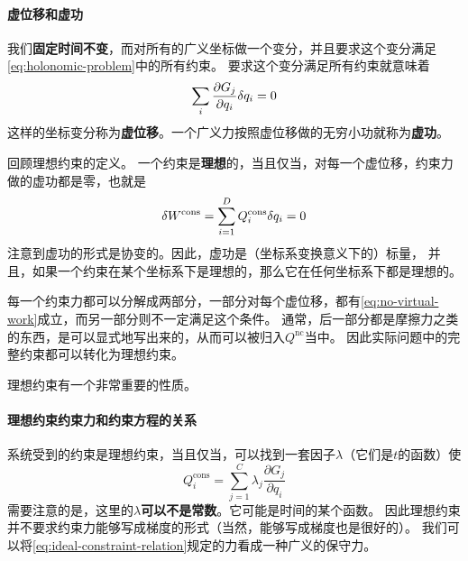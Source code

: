 \documentclass[UTF8, a4paper]{ctexart}
\begin{document}
\paragraph{虚位移和虚功} 我们\textbf{固定时间不变}，而对所有的广义坐标做一个变分，并且要求这个变分满足\eqref{eq:holonomic-problem}中的所有约束。
要求这个变分满足所有约束就意味着
\begin{equation}
    \sum_i \frac{\partial G_j}{\partial q_i} \var q_i = 0
    \label{eq:contemporaneous-variation}
\end{equation}
这样的坐标变分称为\textbf{虚位移}。一个广义力按照虚位移做的无穷小功就称为\textbf{虚功}。

回顾理想约束的定义。
一个约束是\textbf{理想}的，当且仅当，对每一个虚位移，约束力做的虚功都是零，也就是
\begin{equation}
    \var W^\text{cons} = \sum_{i=1}^D Q^\text{cons}_i \var q_i = 0
    \label{eq:no-virtual-work}
\end{equation}
注意到虚功的形式是协变的。因此，虚功是（坐标系变换意义下的）标量，
并且，如果一个约束在某个坐标系下是理想的，那么它在任何坐标系下都是理想的。

每一个约束力都可以分解成两部分，一部分对每个虚位移，都有\eqref{eq:no-virtual-work}成立，而另一部分则不一定满足这个条件。
通常，后一部分都是摩擦力之类的东西，是可以显式地写出来的，从而可以被归入$Q^{\text{nc}}$当中。
因此实际问题中的完整约束都可以转化为理想约束。

理想约束有一个非常重要的性质。

\paragraph{理想约束约束力和约束方程的关系} \label{par:ideal-constraint-relation}
系统受到的约束是理想约束，当且仅当，可以找到一套因子$\lambda$（它们是$t$的函数）使
\begin{equation}
    Q^{\text{cons}}_i = \sum_{j=1}^C \lambda_j \frac{\partial G_j}{\partial q_i} 
    \label{eq:ideal-constraint-relation}
\end{equation}
需要注意的是，这里的$\lambda$\textbf{可以不是常数}。它可能是时间的某个函数。
因此理想约束并不要求约束力能够写成梯度的形式（当然，能够写成梯度也是很好的）。
我们可以将\eqref{eq:ideal-constraint-relation}规定的力看成一种广义的保守力。
\end{document}
